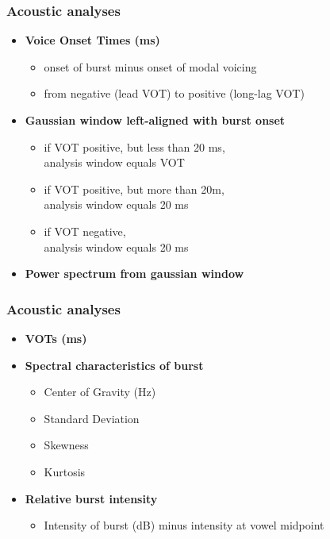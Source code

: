 \documentclass{beamer}
\begin{document}
\begin{frame}
\frametitle{Acoustic analyses}
\begin{itemize}
	\item \textbf{Voice Onset Times (ms)}
	\begin{itemize}
		\item onset of burst minus onset of modal voicing
		\item from negative (lead VOT) to positive (long-lag VOT)
	\end{itemize}
	\item \textbf{Gaussian window left-aligned with burst onset}
	\begin{itemize}
		\item if VOT positive, but less than 20 ms, \\ analysis window equals VOT
		\item if VOT positive, but more than 20m, \\analysis window equals 20 ms
		\item if VOT negative, \\analysis window equals 20 ms
	\end{itemize}
	\item \textbf{Power spectrum from gaussian window}
\end{itemize}
\end{frame}

\begin{frame}
\frametitle{Acoustic analyses}
\begin{itemize}
	\item \textbf{VOTs (ms)}
	\item \textbf{Spectral characteristics of burst}
	\begin{itemize}
		\item Center of Gravity (Hz)
		\item Standard Deviation
		\item Skewness
		\item Kurtosis
	\end{itemize}
	\item \textbf{Relative burst intensity}
	\begin{itemize}
		\item Intensity of burst (dB) minus intensity at vowel midpoint
	\end{itemize}
\end{itemize}
\end{frame}
\end{document}
